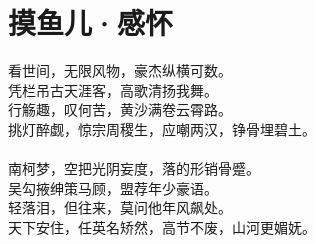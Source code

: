 \chapter{摸鱼儿·感怀}

\leftskip=15mm
\noindent
看世间，无限风物，豪杰纵横可数。\\
凭栏吊古天涯客，高歌清扬我舞。\\
行觞趣，叹何苦，黄沙满卷云霄路。\\
挑灯醉觑，惊宗周稷生，应嘲两汉，铮骨埋碧土。\\
\\
南柯梦，空把光阴妄度，落的形销骨蹙。\\
吴勾掖绅策马顾，盟荐年少豪语。\\
轻落泪，但往来，莫问他年风飙处。\\
天下安住，任英名矫然，高节不废，山河更媚妩。
